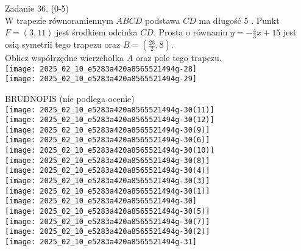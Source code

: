 \documentclass[10pt]{article}
\begin{document}
Zadanie 36. (0-5)\\
W trapezie równoramiennym \(A B C D\) podstawa \(C D\) ma długość 5 . Punkt \(F=(3,11)\) jest środkiem odcinka \(C D\). Prosta o równaniu \(y=-\frac{4}{3} x+15\) jest osią symetrii tego trapezu oraz \(B=\left(\frac{23}{2}, 8\right)\).\\
Oblicz współrzędne wierzchołka \(A\) oraz pole tego trapezu.\\
\texttt{[image: 2025\_02\_10\_e5283a420a8565521494g-28]}\\
\texttt{[image: 2025\_02\_10\_e5283a420a8565521494g-29]}

BRUDNOPIS (nie podlega ocenie)\\
\(\qquad\)\\
\texttt{[image: 2025\_02\_10\_e5283a420a8565521494g-30(11)]}\\
\texttt{[image: 2025\_02\_10\_e5283a420a8565521494g-30(12)]}\\
\texttt{[image: 2025\_02\_10\_e5283a420a8565521494g-30(9)]}\\
\texttt{[image: 2025\_02\_10\_e5283a420a8565521494g-30(6)]}\\
\texttt{[image: 2025\_02\_10\_e5283a420a8565521494g-30(10)]}\\
\texttt{[image: 2025\_02\_10\_e5283a420a8565521494g-30(8)]}\\
\texttt{[image: 2025\_02\_10\_e5283a420a8565521494g-30(4)]}\\
\texttt{[image: 2025\_02\_10\_e5283a420a8565521494g-30(3)]}\\
\texttt{[image: 2025\_02\_10\_e5283a420a8565521494g-30(1)]}\\
\texttt{[image: 2025\_02\_10\_e5283a420a8565521494g-30]}\\
\texttt{[image: 2025\_02\_10\_e5283a420a8565521494g-30(5)]}\\
\(\qquad\)\\
\texttt{[image: 2025\_02\_10\_e5283a420a8565521494g-30(7)]}\\
\texttt{[image: 2025\_02\_10\_e5283a420a8565521494g-30(2)]}\\
\(\qquad\)\\
\texttt{[image: 2025\_02\_10\_e5283a420a8565521494g-31]}
\end{document}
